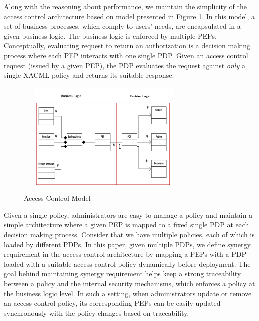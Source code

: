  
Along with the reasoning about performance, we maintain the simplicity of the access control architecture based on model 
presented in Figure \ref{model}. In this model, a set of business processes, which comply to users' needs, are encapsulated in a given business logic. The business logic is enforced by multiple PEPs. Conceptually, evaluating request to return an authorization is a decision making process where each PEP interacts with one single PDP. Given an access control request (issued by a given PEP),
the PDP evaluates the request against \emph{only} a single XACML policy and returns its suitable response.
 
\begin{figure}[!h]
\begin{center}
\includegraphics[height=5.5cm,width=8.5cm]{model}
\caption{Access Control Model}
\label{model}
\end{center}
\end{figure}

Given a single policy, administrators are easy to manage a policy and maintain a simple architecture 
where a given PEP is mapped to a fixed single PDP at each decision making process.
Consider that we have multiple policies, each of which is loaded by different PDPs.
In this paper, given multiple PDPs, we define synergy requirement in the access control architecture by mapping a PEPs with a PDP loaded with a suitable access control policy dynamically before deployment. 
The goal behind maintaining synergy requirement helps keep a strong traceability between a policy and the internal 
security mechanisms, which enforces a policy at the business logic level. In such a setting, when administrators update or remove an access control policy, its corresponding PEPs can be easily updated synchronously with the policy changes based on traceability.



